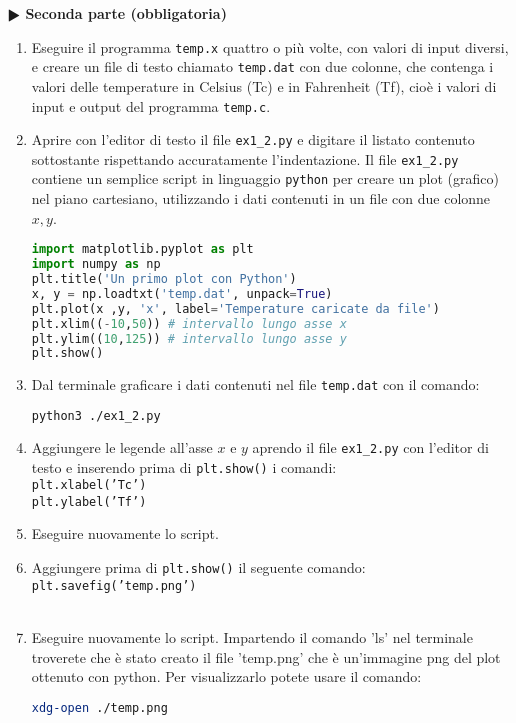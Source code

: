 \documentclass[11pt]{article}
\begin{document}

\textbf{$\RHD$ Seconda parte (obbligatoria)} 
%
\begin{enumerate}
\item Eseguire il programma \texttt{temp.x} quattro o più volte, con valori di input diversi, e creare un file di testo chiamato \texttt{temp.dat} con due colonne,
  che contenga i valori delle temperature in Celsius (Tc) e
  in Fahrenheit (Tf), cioè i valori di input e output del programma \texttt{temp.c}.
\item Aprire con l'editor di testo il file \texttt{ex1\_2.py} e digitare il listato
  contenuto sottostante rispettando accuratamente l'indentazione. Il file \texttt{ex1\_2.py} contiene un
  semplice script in linguaggio \texttt{python} per creare un plot (grafico) nel piano cartesiano, utilizzando i dati contenuti in un file con due colonne $x,y$. 
\begin{lstlisting}[caption={Programma {\it python} \texttt{ex1\_2.py}},language=Python]
import matplotlib.pyplot as plt
import numpy as np
plt.title('Un primo plot con Python')
x, y = np.loadtxt('temp.dat', unpack=True)
plt.plot(x ,y, 'x', label='Temperature caricate da file')
plt.xlim((-10,50)) # intervallo lungo asse x
plt.ylim((10,125)) # intervallo lungo asse y
plt.show()
\end{lstlisting}
\item Dal terminale graficare i dati contenuti nel file \texttt{temp.dat} con il comando:\\
  \begin{lstlisting}[language=bash,numbers=none]
    python3 ./ex1_2.py
\end{lstlisting}
\item Aggiungere le legende all'asse $x$ e $y$ aprendo il file \texttt{ex1\_2.py} con l'editor di testo e inserendo prima di \texttt{plt.show()} i comandi:
\\
\texttt{plt.xlabel('Tc')}
\\
\texttt{plt.ylabel('Tf')}
 \item Eseguire nuovamente lo script.
 \item Aggiungere prima di \texttt{plt.show()} il seguente comando:
\\
\texttt{plt.savefig('temp.png')}
\\\
\item Eseguire nuovamente lo script. Impartendo il comando 'ls' nel terminale troverete che è stato
  creato il file 'temp.png' che è un'immagine png del plot ottenuto con python. Per visualizzarlo potete
  usare il comando:
  \begin{lstlisting}[language=bash,numbers=none]
    xdg-open ./temp.png
\end{lstlisting}


\end{enumerate}
\end{document}
